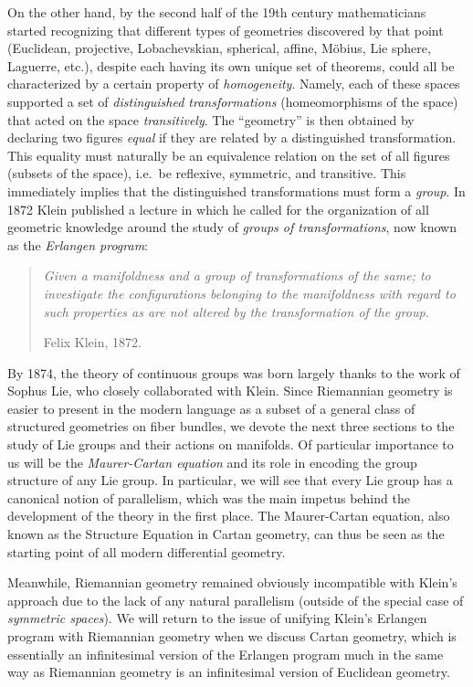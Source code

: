 \begin{hrem*}
    On the other hand, by the second half of the 19th century mathematicians started recognizing that different types of geometries discovered by that point (Euclidean, projective, Lobachevskian, spherical, affine, M\"obius, Lie sphere, Laguerre, etc.), despite each having its own unique set of theorems, could all be characterized by a certain property of \emph{homogeneity}. Namely, each of these spaces supported a set of \emph{distinguished transformations} (homeomorphisms of the space) that acted on the space \emph{transitively}. The ``geometry'' is then obtained by declaring two figures \emph{equal} if they are related by a distinguished transformation. This equality must naturally be an equivalence relation on the set of all figures (subsets of the space), i.e.\ be reflexive, symmetric, and transitive. This immediately implies that the distinguished transformations must form a \emph{group}. In 1872 Klein published a lecture in which he called for the organization of all geometric knowledge around the study of \emph{groups of transformations}, now known as the \emph{Erlangen program}:
    \begin{quote}
        \small
        \emph{Given a manifoldness and a group of transformations of the same; to investigate the configurations belonging to the manifoldness with regard to such properties as are not altered by the transformation of the group.}
        
        \hfill Felix Klein, 1872.
    \end{quote}
    By 1874, the theory of continuous groups was born largely thanks to the work of Sophus Lie, who closely collaborated with Klein. Since Riemannian geometry is easier to present in the modern language as a subset of a general class of structured geometries on fiber bundles, we devote the next three sections to the study of Lie groups and their actions on manifolds. Of particular importance to us will be the \emph{Maurer-Cartan equation} and its role in encoding the group structure of any Lie group. In particular, we will see that every Lie group has a canonical notion of parallelism, which was the main impetus behind the development of the theory in the first place. The Maurer-Cartan equation, also known as the Structure Equation in Cartan geometry, can thus be seen as the starting point of all modern differential geometry.
    
    Meanwhile, Riemannian geometry remained obviously incompatible with Klein's approach due to the lack of any natural parallelism (outside of the special case of \emph{symmetric spaces}). We will return to the issue of unifying Klein's Erlangen program with Riemannian geometry when we discuss Cartan geometry, which is essentially an infinitesimal version of the Erlangen program much in the same way as Riemannian geometry is an infinitesimal version of Euclidean geometry.
\end{hrem*}









